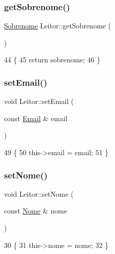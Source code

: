 \subsubsection{\texorpdfstring{get\+Sobrenome()}{getSobrenome()}}
{\footnotesize\ttfamily \mbox{\hyperlink{class_sobrenome}{Sobrenome}} Leitor\+::get\+Sobrenome (\begin{DoxyParamCaption}{ }\end{DoxyParamCaption})\hspace{0.3cm}{\ttfamily [inline]}}


\begin{DoxyCode}
44    \{
45      \textcolor{keywordflow}{return} sobrenome;
46    \}
\end{DoxyCode}
\mbox{\label{class_leitor_adc476ba94b63efc6416c22989e55e7e0}} 
\subsubsection{\texorpdfstring{set\+Email()}{setEmail()}}
{\footnotesize\ttfamily void Leitor\+::set\+Email (\begin{DoxyParamCaption}\item[{const \mbox{\hyperlink{class_email}{Email}} \&}]{email }\end{DoxyParamCaption})\hspace{0.3cm}{\ttfamily [inline]}}


\begin{DoxyCode}
49   \{
50     this->email = email;
51   \}
\end{DoxyCode}
\mbox{\label{class_leitor_a2698f4915451a7a53985b8cd275f4ae1}} 
\subsubsection{\texorpdfstring{set\+Nome()}{setNome()}}
{\footnotesize\ttfamily void Leitor\+::set\+Nome (\begin{DoxyParamCaption}\item[{const \mbox{\hyperlink{class_nome}{Nome}} \&}]{nome }\end{DoxyParamCaption})\hspace{0.3cm}{\ttfamily [inline]}}


\begin{DoxyCode}
30                                   \{
31         this->nome = nome;
32     \}
\end{DoxyCode}
\mbox{\label{class_leitor_a6ddd3a32947bf14f52f1794b5e2d552f}} 
